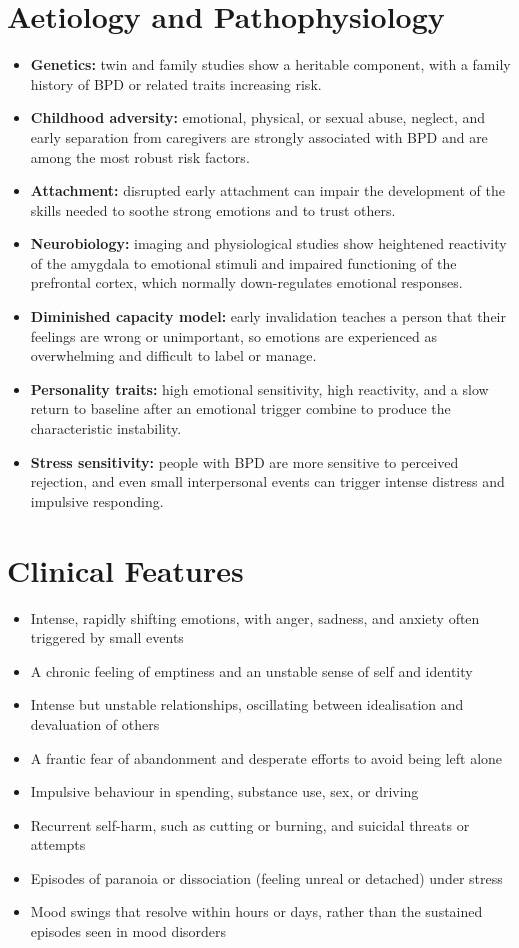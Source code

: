 \section*{Aetiology and Pathophysiology}
\begin{itemize}
    \item \textbf{Genetics:} twin and family studies show a heritable component, with a family history of BPD or related traits increasing risk.
    \item \textbf{Childhood adversity:} emotional, physical, or sexual abuse, neglect, and early separation from caregivers are strongly associated with BPD and are among the most robust risk factors.
    \item \textbf{Attachment:} disrupted early attachment can impair the development of the skills needed to soothe strong emotions and to trust others.
    \item \textbf{Neurobiology:} imaging and physiological studies show heightened reactivity of the amygdala to emotional stimuli and impaired functioning of the prefrontal cortex, which normally down-regulates emotional responses.
    \item \textbf{Diminished capacity model:} early invalidation teaches a person that their feelings are wrong or unimportant, so emotions are experienced as overwhelming and difficult to label or manage.
    \item \textbf{Personality traits:} high emotional sensitivity, high reactivity, and a slow return to baseline after an emotional trigger combine to produce the characteristic instability.
    \item \textbf{Stress sensitivity:} people with BPD are more sensitive to perceived rejection, and even small interpersonal events can trigger intense distress and impulsive responding.
\end{itemize}

\section*{Clinical Features}
\begin{itemize}
    \item Intense, rapidly shifting emotions, with anger, sadness, and anxiety often triggered by small events
    \item A chronic feeling of emptiness and an unstable sense of self and identity
    \item Intense but unstable relationships, oscillating between idealisation and devaluation of others
    \item A frantic fear of abandonment and desperate efforts to avoid being left alone
    \item Impulsive behaviour in spending, substance use, sex, or driving
    \item Recurrent self-harm, such as cutting or burning, and suicidal threats or attempts
    \item Episodes of paranoia or dissociation (feeling unreal or detached) under stress
    \item Mood swings that resolve within hours or days, rather than the sustained episodes seen in mood disorders
\end{itemize}

